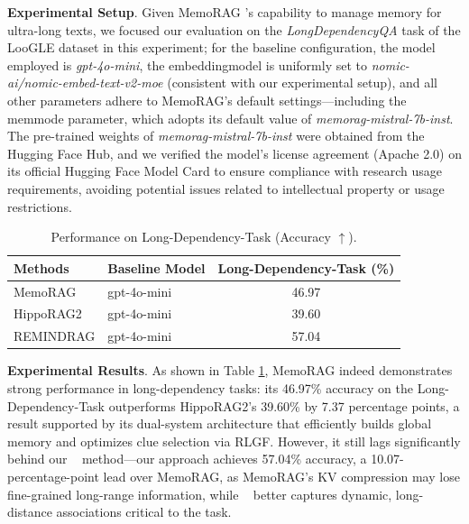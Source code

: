 \textbf{Experimental Setup}. Given MemoRAG \cite{Main11}'s capability to manage memory for ultra-long texts, we focused our evaluation on the \textit{LongDependencyQA} task of the LooGLE dataset \cite{Benchmark1} in this experiment; for the baseline configuration, the model employed is \textit{gpt-4o-mini}, the embedding\textunderscore model is uniformly set to \textit{nomic-ai/nomic-embed-text-v2-moe} (consistent with our experimental setup), and all other parameters adhere to MemoRAG's default settings—including the mem\textunderscore mode parameter, which adopts its default value of \textit{memorag-mistral-7b-inst}. The pre-trained weights of \textit{memorag-mistral-7b-inst} were obtained from the Hugging Face Hub, and we verified the model's license agreement (Apache 2.0) on its official Hugging Face Model Card to ensure compliance with research usage requirements, avoiding potential issues related to intellectual property or usage restrictions.


\begin{table}[htbp]
  \centering
  \captionsetup{skip=10pt}           %
  \begin{tabular}{l|l|c}
    \hline
    \hline
    \textbf{Methods } & \textbf{Baseline Model} & \textbf{Long-Dependency-Task (\%)} \\
    \hline
    MemoRAG        & gpt-4o-mini             & 46.97                              \\
    HippoRAG2      & gpt-4o-mini             & 39.60                              \\
    REMINDRAG      & gpt-4o-mini             & 57.04                              \\
    \hline
    \hline
  \end{tabular}
  \caption{Performance on Long-Dependency-Task (Accuracy $\uparrow$).}
  \label{tab:more-baseline-experiment}
\end{table}

\textbf{Experimental Results}. As shown in Table \ref{tab:more-baseline-experiment}, MemoRAG indeed demonstrates strong performance in long-dependency tasks: its 46.97\% accuracy on the Long-Dependency-Task outperforms HippoRAG2's 39.60\% by 7.37 percentage points, a result supported by its dual-system architecture that efficiently builds global memory and optimizes clue selection via RLGF. However, it still lags significantly behind our \ours~ method—our approach achieves 57.04\% accuracy, a 10.07-percentage-point lead over MemoRAG, as MemoRAG's KV compression may lose fine-grained long-range information, while \ours~ better captures dynamic, long-distance associations critical to the task.